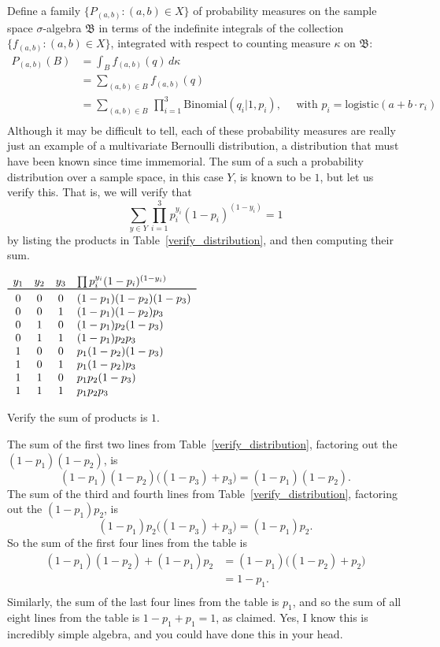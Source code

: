 \documentclass[
twoside=true,
paper=letter,
fontsize=11pt,
pagesize=auto,
leqno,
openany,
headsepline,
overfullrule,
]{scrbook}
\theoremstyle{plain}
\theoremstyle{plain}
\theoremstyle{definition}
\theoremstyle{bfnoteitalic}
\theoremstyle{bfnoteroman}
\newcommand{\sigalg}[1]{\mathfrak{#1}}
\newcommand{\textsigma}{\hbox{\large{$\sigma$}}\kern-1pt}
\newcommand{\funcf}{f}
\newcommand{\function}{f}
\newcommand{\measurespace}{X}
\newcommand{\measurespaceii}{Y}
\newcommand{\setii}{B}
\newcommand{\pspace}{\measurespace}%
\newcommand{\sspace}{\measurespaceii}%
\newcommand{\sspacesig}{\sigalg{B}}
\begin{document}
Define a family $\{P_{(a,b)}:(a,b)\in\pspace\}$ of probability measures on the sample space \textsigma-algebra
$\sspacesig$ in terms of the indefinite integrals of the collection
$\{ \function_{(a,b)} : (a,b)\in\pspace \}$, integrated with respect to counting measure $\kappa$ on
$\sspacesig$:
\begin{align*}
P_{(a,b)} (\setii)
& =
\int_\setii \funcf_{(a,b)}(q)\, d\kappa \\
& =
\sum_{(a,b)\in\setii} f_{(a,b)}(q) \\
& =
\sum_{(a,b)\in\setii}
\,
\prod_{i=1}^{3}
\text{Binomial}(q_i \vert 1, p_i),\quad
\text{ with $p_i = \text{logistic}(a  + b\cdot r_i )$} \\
\end{align*}
Although it may be difficult to tell, each of these probability measures are really just an example of a  multivariate Bernoulli distribution, a distribution that must have been known since time immemorial.  The sum of a such a probability distribution over a sample space, in this case $\sspace$, is known to be $1$, but let us verify this.
That is, we will verify that
\[
\sum_{y\in Y}\prod_{i=1}^3 p_i^{y_i}(1-p_i)^{(1-y_i)}
=
1
\]
by listing the products in Table~\ref{verify_distribution}, and then computing their sum.
\begin{table}
\centering
\renewcommand{\arraystretch}{1.1}
$\begin{array}{cccl}
y_1 & y_2 & y_3 & \prod p_i^{y_i} (1-p_i)^{(1-y_i)} \\
\toprule
0 & 0 & 0 & (1-p_1)(1-p_2)(1-p_3) \\
0 & 0 & 1 & (1-p_1)(1-p_2)p_3 \\
0 & 1 & 0 & (1-p_1)p_2(1-p_3) \\
0 & 1 & 1 & (1-p_1)p_2 p_3 \\
1 & 0 & 0 & p_1 (1-p_2) (1-p_3) \\
1 & 0 & 1 & p_1 (1-p_2) p_3 \\
1 & 1 & 0 & p_1 p_2 (1-p_3) \\
1 & 1 & 1 & p_1 p_2 p_3 \\
\end{array}$
\caption{Verify the sum of products is $1$.}\label{verify_distribution}
\end{table}

The sum of the first two lines from Table~\ref{verify_distribution}, factoring out the
$(1 - p_1) (1 - p_2)$, is
\[
(1 - p_1) (1 - p_2) \bigl((1-p_3) + p_3\bigr)
=
(1 - p_1) (1 - p_2).
\]
The sum of the third and fourth lines from Table~\ref{verify_distribution}, factoring out the
$(1-p_1)p_2$,  is
\[
(1-p_1)p_2\bigl((1-p_3)+p_3\bigr)
=
(1-p_1)p_2.
\]
So the sum of the first four lines from the table is
\begin{align*}
(1 - p_1) (1 - p_2)
+
(1-p_1)p_2
& =
(1-p_1)\bigl( (1-p_2) + p_2 \bigr) \\
& = 1 - p_1.\\
\end{align*}
Similarly, the sum of the last four lines from the table is $p_1$, and so the sum of all eight lines from the table is
$1 - p_1 + p_1 = 1$, as claimed. Yes, I know this is incredibly simple algebra, and you could have done this in your head.
\end{document}
